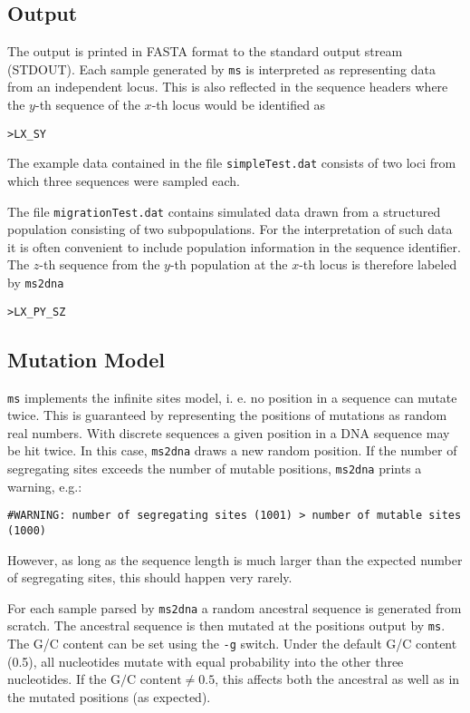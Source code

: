 \documentclass[a4paper, english]{article}
\begin{document}
\subsection*{Output}
The output is printed in FASTA format
to the standard output stream (STDOUT). 
Each sample generated by \texttt{ms} is interpreted as representing data from an
independent locus. This is also reflected in the sequence headers where the
$y$-th sequence of the $x$-th locus would be identified as
\begin{verbatim}
>LX_SY
\end{verbatim}
The example data contained in the file \texttt{simpleTest.dat} consists of two
loci from which three sequences were sampled each.

The file \texttt{migrationTest.dat} contains simulated data drawn from a
structured population consisting of two subpopulations. For the interpretation of such 
data it is often convenient to include population information in the sequence
identifier. The $z$-th sequence from the $y$-th population at the $x$-th locus is
therefore labeled by \texttt{ms2dna}
\begin{verbatim}
>LX_PY_SZ
\end{verbatim}

\subsection*{Mutation Model}
\texttt{ms} implements the infinite sites model,
i. e. no position in a sequence can mutate twice. This is guaranteed by
representing the positions of mutations as random real numbers. 
With discrete sequences a given position in a DNA sequence may be hit
twice. In this case, \texttt{ms2dna} draws a new random
position. If the
number of segregating sites exceeds the number of mutable positions,
\texttt{ms2dna} prints a warning, e.g.:
\begin{verbatim}
#WARNING: number of segregating sites (1001) > number of mutable sites (1000)
\end{verbatim}
However, as long
as the sequence length is much larger than the expected number of segregating
sites, this should happen very rarely.

For each sample parsed by \texttt{ms2dna} a random ancestral sequence is
generated from scratch.
The ancestral sequence is then mutated at the positions output by \texttt{ms}.
The G/C content can be set using
the \texttt{-g} switch. Under the default G/C content (0.5), all nucleotides mutate with equal
probability into the other three nucleotides. If the $\textrm{G/C content} \ne
0.5$, this affects both the ancestral as well as in the mutated positions (as
expected).
\end{document}
